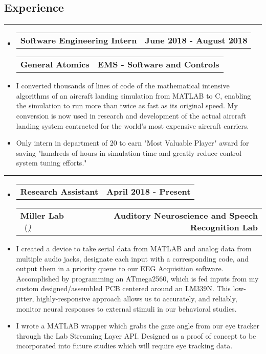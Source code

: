 \documentclass[10pt,letterpaper]{article}
\makeatletter
\newcommand{\items}[2]
{
	\begin{tabular*}{\linewidth}{l @{\extracolsep{\fill}} r}
		#1 & #2 \\
	\end{tabular*}
}
\newcommand{\sectionbreak}
{
	\vspace{-1.2em}
	\rule{\textwidth}{1.7pt}
	\vspace{-1.7em}
}
\makeatother
\begin{document}
\vspace{-1.5em}

\subsection*{Experience}
\sectionbreak

\begin{itemize}
	\item[]
		\items
			{\textbf{Software Engineering Intern}} 
			{\textbf{June 2018 - August 2018}}
		\items
			{\textbf{General Atomics}}
			{\textbf{EMS - Software and Controls}} 
		\item
			I converted thousands of lines of code of the mathematical intensive algorithms of an aircraft landing simulation from MATLAB to C, enabling the simulation to run more than twice as fast as its original speed. My conversion is now used in research and development of the actual aircraft landing system contracted for the world’s most expensive aircraft carriers.
		\item
			Only intern in department of 20 to earn "Most Valuable Player" award for saving "hundreds of hours in simulation time and greatly reduce control system tuning efforts."

\end{itemize}

\hrule

\begin{itemize}
	\item[]
		\items
			{\textbf{Research Assistant}} 
			{\textbf{April 2018 - Present}}
		\items
		{\textbf{Miller Lab} \ (\href{https://millerlab.faculty.ucdavis.edu}{\small \emph{\underline{\smash{millerlab.faculty.ucdavis.edu})}}} }
			{\textbf{Auditory Neuroscience and Speech Recognition Lab}} 
		\item
			I created a device to take serial data from MATLAB and analog data from multiple audio jacks, designate each input with a corresponding code, and output them in a priority queue to our EEG Acquisition software. Accomplished by programming an ATmega2560, which is fed inputs from my custom designed/assembled PCB centered around an LM339N. This low-jitter, highly-responsive approach allows us to accurately, and reliably, monitor neural responses to external stimuli in our behavioral studies.
		\item 
			I wrote a MATLAB wrapper which grabs the gaze angle from our eye tracker through the Lab Streaming Layer API. Designed as a proof of concept to be incorporated into future studies which will require eye tracking data.
\end{itemize}
\end{document}

